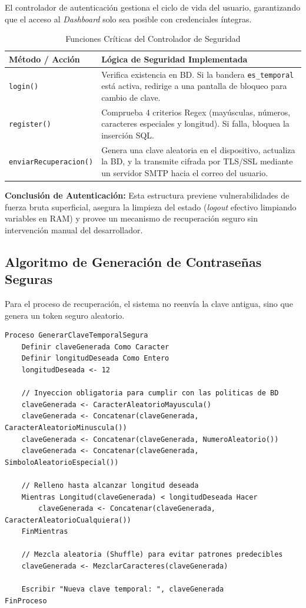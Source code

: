\documentclass[11pt,a4paper]{article}
\begin{document}
El controlador de autenticación gestiona el ciclo de vida del usuario, garantizando que el acceso al \textit{Dashboard} solo sea posible con credenciales íntegras.

\begin{table}[htpb]
    \centering
    \caption{Funciones Críticas del Controlador de Seguridad}
    \begin{tabularx}{\textwidth}{l X}
        \toprule
        \textbf{Método / Acción} & \textbf{Lógica de Seguridad Implementada} \\
        \midrule
        \texttt{login()} & Verifica existencia en BD. Si la bandera \texttt{es\_temporal} está activa, redirige a una pantalla de bloqueo para cambio de clave. \\
        \texttt{register()} & Comprueba 4 criterios Regex (mayúsculas, números, caracteres especiales y longitud). Si falla, bloquea la inserción SQL. \\
        \texttt{enviarRecuperacion()}& Genera una clave aleatoria en el dispositivo, actualiza la BD, y la transmite cifrada por TLS/SSL mediante un servidor SMTP hacia el correo del usuario.\\
        \bottomrule
    \end{tabularx}
\end{table}

\textbf{Conclusión de Autenticación:} Esta estructura previene vulnerabilidades de fuerza bruta superficial, asegura la limpieza del estado (\textit{logout} efectivo limpiando variables en RAM) y provee un mecanismo de recuperación seguro sin intervención manual del desarrollador.

\subsection{Algoritmo de Generación de Contraseñas Seguras}

Para el proceso de recuperación, el sistema no reenvía la clave antigua, sino que genera un token seguro aleatorio.

\begin{lstlisting}[caption={Pseudocódigo para generación de clave segura temporal}]
Proceso GenerarClaveTemporalSegura
    Definir claveGenerada Como Caracter
    Definir longitudDeseada Como Entero
    longitudDeseada <- 12
    
    // Inyeccion obligatoria para cumplir con las politicas de BD
    claveGenerada <- CaracterAleatorioMayuscula()
    claveGenerada <- Concatenar(claveGenerada, CaracterAleatorioMinuscula())
    claveGenerada <- Concatenar(claveGenerada, NumeroAleatorio())
    claveGenerada <- Concatenar(claveGenerada, SimboloAleatorioEspecial())
    
    // Relleno hasta alcanzar longitud deseada
    Mientras Longitud(claveGenerada) < longitudDeseada Hacer
        claveGenerada <- Concatenar(claveGenerada, CaracterAleatorioCualquiera())
    FinMientras
    
    // Mezcla aleatoria (Shuffle) para evitar patrones predecibles
    claveGenerada <- MezclarCaracteres(claveGenerada)
    
    Escribir "Nueva clave temporal: ", claveGenerada
FinProceso
\end{lstlisting}
\end{document}
